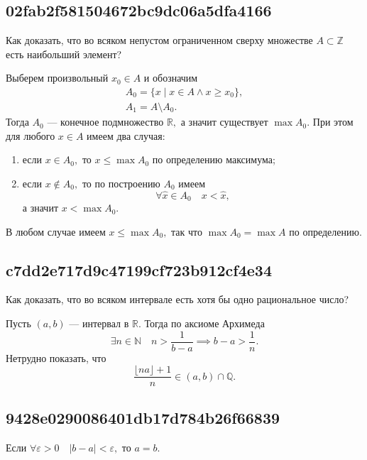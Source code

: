 \documentclass[11pt, a5paper]{article}
\newenvironment{note}[1]{\goodbreak\par\subsection{\hfill \color{lightgray}\tiny #1}}{}
\newenvironment{cloze}[2][\ldots]{\begin{leftbar}}{\end{leftbar}}
\newenvironment{icloze}[2][\ldots]{%
  \ignorespaces\text{\tiny \color{lightgray} \{\{c#2:: }%
}{%
  \text{\tiny \color{lightgray}\}\}}\unskip%
}
\begin{document}
    \begin{note}{02fab2f581504672bc9dc06a5dfa4166}
        Как доказать, что во всяком непустом ограниченном сверху множестве \( A
        \subset \mathbb Z \) есть наибольший элемент?

        \begin{cloze}{1}
            Выберем произвольный \( x_0 \in A \) и обозначим \[
                \begin{gathered}
                    A_0 = \{ x \mid x \in A \land x \geqslant x_0 \},  \\
                    A_1 = A \setminus A_0.
                \end{gathered}
            \]
            Тогда \( A_0 \) --- конечное подмножество \( \mathbb R, \) а значит
            существует \( \max A_0. \) При этом для любого \( x \in A \) имеем
            два случая:
            \begin{enumerate}
                \item если \( x \in A_0,  \) то \( x \leqslant \max A_0 \) по
                    определению максимума;
                \item если \( x \not\in A_0,  \) то по построению \( A_0 \)
                    имеем \[ \forall \hat{x} \in A_0 \quad x < \hat{x}, \] а
                    значит \( x < \max A_0. \)
            \end{enumerate}

            В любом случае имеем \( x \leqslant \max A_0, \) так что \( \max A_0
            = \max A \) по определению.
        \end{cloze}
    \end{note}

    \begin{note}{c7dd2e717d9c47199cf723b912cf4e34}
        Как доказать, что во всяком интервале есть хотя бы одно рациональное
        число?

        \begin{cloze}{1}
            Пусть \( (a, b) \) --- интервал в \( \mathbb R. \) Тогда по аксиоме
            Архимеда \[
               \exists n \in \mathbb N \quad n > \frac{1}{b - a} \implies b - a
               > \frac{1}{n}.
            \] Нетрудно показать, что \[
                \dfrac{\lfloor na \rfloor + 1}{n} \in (a, b) \cap \mathbb Q .
            \]
        \end{cloze}
    \end{note}

    \begin{note}{9428e0290086401db17d784b26f66839}
        Если \( \forall \varepsilon > 0 \quad |b - a| < \varepsilon, \) то
        \begin{icloze}{1}\( a = b. \)\end{icloze}
    \end{note}
\end{document}
